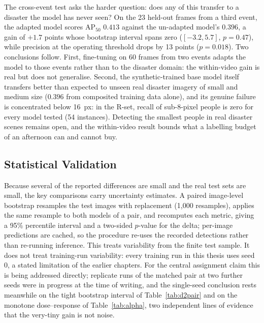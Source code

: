 The cross-event test asks the harder question: does any of this transfer to a
disaster the model has never seen? On the 23 held-out frames from a third event,
the adapted model scores $\mathrm{AP}_{50}$ $0.413$ against the un-adapted
model's $0.396$, a gain of $+1.7$ points whose bootstrap interval spans zero
($[-3.2, 5.7]$, $p=0.47$), while precision at the operating threshold drops by
13 points ($p=0.018$). Two conclusions follow. First, fine-tuning on 60 frames
from two events adapts the model to those events rather than to the disaster
domain: the within-video gain is real but does not generalise. Second, the
synthetic-trained base model itself transfers better than expected to unseen
real disaster imagery of small and medium size ($0.396$ from composited training
data alone), and its genuine failure is concentrated below 16~px: in the R-set,
recall of sub-8-pixel people is zero for every model tested (54 instances).
Detecting the smallest people in real disaster scenes remains open, and the
within-video result bounds what a labelling budget of an afternoon can and
cannot buy.

\subsection{Statistical Validation}
\label{sec:stats}
Because several of the reported differences are small and the real test sets are
small, the key comparisons carry uncertainty estimates. A paired image-level
bootstrap resamples the test images with replacement (1{,}000 resamples), applies
the same resample to both models of a pair, and recomputes each metric, giving a
95\% percentile interval and a two-sided $p$-value for the delta; per-image
predictions are cached, so the procedure re-uses the recorded detections rather
than re-running inference. This treats variability from the finite test sample.
It does not treat training-run variability: every training run in this thesis
uses seed 0, a stated limitation of the earlier chapters. For the central
assignment claim this is being addressed directly; replicate runs of the matched
pair at two further seeds were in progress at the time of writing, and the
single-seed conclusion rests meanwhile on the tight bootstrap interval of
Table~\ref{tab:d2pair} and on the monotone dose--response of
Table~\ref{tab:alpha}, two independent lines of evidence that the very-tiny
gain is not noise.

